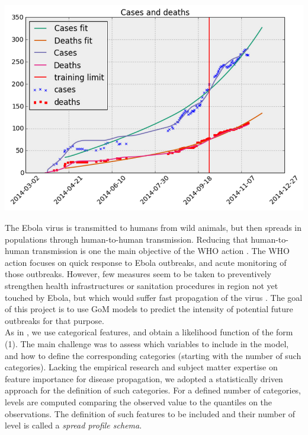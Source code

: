 \documentclass[twoside]{article}
\begin{document}
\vspace{.2 in}
\begingroup
\centering
\includegraphics[scale=0.25]{./img/SIR_fit.png}
\endgroup

\vspace{.2 in}

The Ebola virus is transmitted to humans from wild animals, but then spreads in populations through human-to-human transmission. Reducing that human-to-human transmission is one the main objective of the WHO action \cite{ebolinfo}. The WHO action focuses on quick response to Ebola outbreaks, and acute monitoring of those outbreaks. However, few measures seem to be taken to preventively strengthen health infrastructures or sanitation procedures in region not yet touched by Ebola, but which would suffer fast propagation of the virus \cite{ebolresp}. The goal of this project is to use GoM models to predict the intensity of potential future outbreaks for that purpose.\\

As in \cite{malaria}, we use categorical features, and obtain a likelihood function of the form (1). The main challenge was to assess which variables to include in the model, and how to define the corresponding categories (starting with the number of such categories). Lacking the empirical research and subject matter expertise on feature importance for disease propagation, we adopted a statistically driven approach for the definition of such categories. For a defined number of categories, levels are computed comparing the observed value to the quantiles on the observations. The definition of such features to be included and their number of level is called a \textit{spread profile schema}.\\
\end{document}
